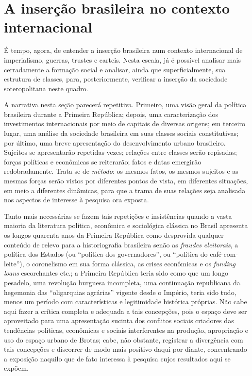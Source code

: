 \section{A inserção brasileira no contexto internacional}\label{sec:insbrascontint}

É tempo, agora, de entender a inserção brasileira num contexto internacional de imperialismo, guerras, trustes e carteis. Nesta escala, já é possível analisar mais cerradamente a formação social e analisar, ainda que superficialmente, sua estrutura de classes, para, posteriormente, verificar a inserção da sociedade soteropolitana neste quadro.

A narrativa nesta seção parecerá repetitiva. Primeiro, uma visão geral da política brasileira durante a Primeira República; depois, uma caracterização dos investimentos internacionais por meio de capitais de diversas origens; em terceiro lugar, uma análise da sociedade brasileira em suas classes sociais constitutivas; por último, uma breve apresentação do desenvolvimento urbano brasileiro. Sujeitos se apresentarão repetidas vezes; relações entre classes serão repisadas; forças políticas e econômicas se reiterarão; fatos e datas emergirão redobradamente. Trata-se de  \textit{método}: os mesmos fatos, os mesmos sujeitos e as mesmas forças serão vistos por diferentes pontos de vista, em diferentes situações, em meio a diferentes dinâmicas, para que a trama de suas relações seja analisada nos aspectos de interesse à pesquisa ora exposta. 

Tanto mais necessárias se fazem tais repetições e insistências quando a vasta maioria da literatura política, econômica e sociológica clássica no Brasil apresenta os longos quarenta anos da Primeira República como desprovida qualquer conteúdo de relevo para a historiografia brasileira senão as \textit{fraudes eleitorais}, a política dos Estados (ou ``política dos governadores'', ou ``política do café-com-leite''), o coronelismo em sua forma clássica, as crises econômicas e os \textit{funding loans} escorchantes etc.; a Primeira República teria sido como que um longo pesadelo, uma revolução burguesa incompleta, uma continuação republicana da hegemonia das ``oligarquias agrárias'' vigente desde o Império, teria sido tudo, menos um período com características e legitimidade histórica próprias. Não cabe aqui fazer a crítica completa e adequada a tais concepções, pois o espaço deve ser aproveitado para uma apresentação sucinta dos conflitos sociais criadores das tendências políticas, econômicas e sociais interferentes na produção, apropriação e uso do espaço urbano de Brotas; cabe, não obstante, registrar a divergência com tais concepções e discorrer de modo mais positivo daqui por diante, concentrando a exposição naquilo que de fato interessa à pesquisa cujos resultados aqui se expõem.

